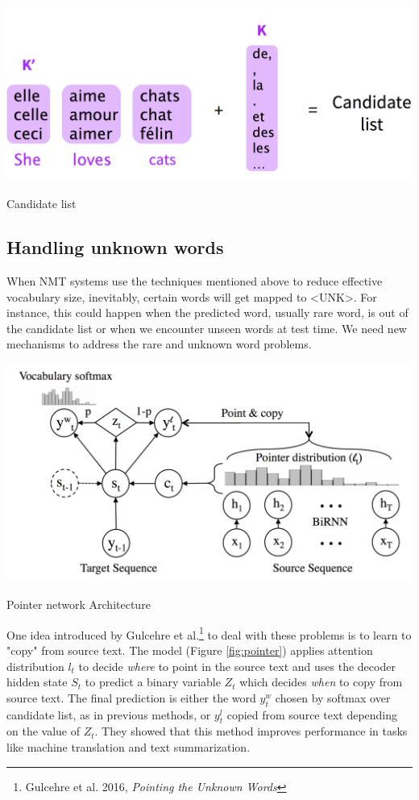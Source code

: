 \documentclass{tufte-handout}
\begin{document}
\begin{marginfigure}
	\centering
	\includegraphics[width=0.9\linewidth]{candidate_list.png}
	\caption {Candidate list}
	\label{fig:candidate}
\end{marginfigure}

\subsection{Handling unknown words}
When NMT systems use the techniques mentioned above to reduce effective vocabulary size, inevitably, certain words will get mapped to <UNK>. For instance, this could happen when the predicted word, usually rare word, is out of the candidate list or when we encounter unseen words at test time. We need new mechanisms to address the rare and unknown word problems.

\begin{marginfigure}
	\centering
	\includegraphics[width=0.9\linewidth]{pointer.png}
	\caption {Pointer network Architecture}
	\label{fig:pointer}
\end{marginfigure}
One idea introduced by Gulcehre et al.\footnote{Gulcehre et al. 2016, \textit{Pointing the Unknown Words}}
to deal with these problems is to learn to "copy" from source text. The model (Figure \ref{fig:pointer}) applies attention distribution $l_t$ to decide \textit{where} to point in the source text and uses the decoder hidden state $S_t$ to predict a binary variable $Z_t$ which decides \textit{when} to copy from source text. The final prediction is either the word $y_t^w$ chosen by softmax over candidate list, as in previous methods, or $y_t^l$ copied from source text depending on the value of $Z_t$.
They showed that this method improves performance in tasks like machine translation and text summarization.
\end{document}
